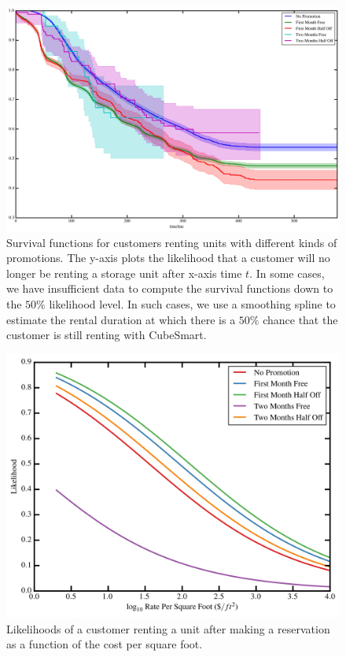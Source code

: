 \documentclass[times]{aastex6}
\begin{document}
\begin{figure}
	\includegraphics[width=0.9\columnwidth]{plots/DurationsSurvival_Breakdown_Overlaid.jpg}
    \caption{Survival functions for customers renting units with different kinds of promotions. The y-axis plots the likelihood that a customer will no longer be renting a storage unit after x-axis time $t$. In some cases, we have insufficient data to compute the survival functions down to the $50\%$ likelihood level. In such cases, we use a smoothing spline to estimate the rental duration at which there is a $50\%$ chance that the customer is still renting with CubeSmart.}
    \label{fig:SurvivalFunctions}
\end{figure}

\begin{figure}
	\includegraphics[width=0.9\columnwidth]{plots/ProbabilityCurve.jpg}
    \caption{Likelihoods of a customer renting a unit after making a reservation as a function of the cost per square foot.}
    \label{fig:ProbabilityCurve}
\end{figure}
\end{document}
